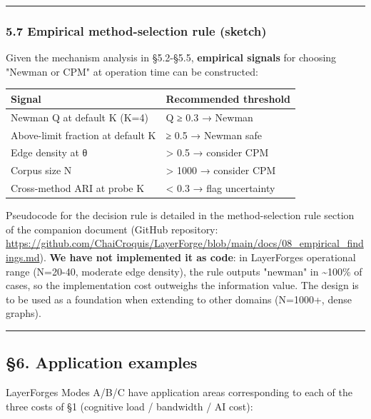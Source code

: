 \documentclass[
]{article}
\newcounter{none} %
\begin{document}
\begin{center}\rule{0.5\linewidth}{0.5pt}\end{center}

\subsubsection{5.7 Empirical method-selection rule
(sketch)}\label{57-empirical-method-selection-rule-sketch}

Given the mechanism analysis in §5.2-§5.5, \textbf{empirical signals}
for choosing "Newman or CPM" at operation time can be constructed:

{\def\LTcaptype{none} %
\begin{longtable}[]{@{}ll@{}}
\toprule\noalign{}
Signal & Recommended threshold \\
\midrule\noalign{}
\endhead
\bottomrule\noalign{}
\endlastfoot
Newman Q at default K (K=4) & Q ≥ 0.3 → Newman \\
Above-limit fraction at default K & ≥ 0.5 → Newman safe \\
Edge density at θ & \textgreater{} 0.5 → consider CPM \\
Corpus size N & \textgreater{} 1000 → consider CPM \\
Cross-method ARI at probe K & \textless{} 0.3 → flag uncertainty \\
\end{longtable}
}

Pseudocode for the decision rule is detailed in the method-selection
rule section of the companion document (GitHub repository:
\url{https://github.com/ChaiCroquis/LayerForge/blob/main/docs/08_empirical_findings.md}).
\textbf{We have not implemented it as code}: in
LayerForge\textquotesingle s operational range (N=20-40, moderate edge
density), the rule outputs "newman" in \textasciitilde100\% of cases, so
the implementation cost outweighs the information value. The design is
to be used as a foundation when extending to other domains (N=1000+,
dense graphs).

\begin{center}\rule{0.5\linewidth}{0.5pt}\end{center}

\subsection{§6. Application examples}\label{6-application-examples}

LayerForge\textquotesingle s Modes A/B/C have application areas
corresponding to each of the three costs of §1 (cognitive load /
bandwidth / AI cost):
\end{document}
